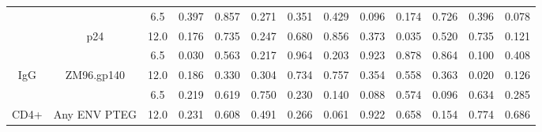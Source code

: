 \documentclass[12pt]{article} %
\begin{document}
\begin{tabular}{ccccccccccccc}
 &  & 6.5 & 0.397 & 0.857 & 0.271 & 0.351 & 0.429 & 0.096 & 0.174 & 0.726 & 0.396 & 0.078\\
\cmidrule{3-13}
 & \multirow{-3}{*}{\centering\arraybackslash p24} & 12.0 & 0.176 & 0.735 & 0.247 & 0.680 & 0.856 & 0.373 & 0.035 & 0.520 & 0.735 & 0.121\\
\cmidrule{2-13}
 &  & 6.5 & 0.030 & 0.563 & 0.217 & 0.964 & 0.203 & 0.923 & 0.878 & 0.864 & 0.100 & 0.408\\
\cmidrule{3-13}
\multirow{-12}{*}{\centering\arraybackslash IgG} & \multirow{-2}{*}{\centering\arraybackslash ZM96.gp140} & 12.0 & 0.186 & 0.330 & 0.304 & 0.734 & 0.757 & 0.354 & 0.558 & 0.363 & 0.020 & 0.126\\
\cmidrule{1-13}
 &  & 6.5 & 0.219 & 0.619 & 0.750 & 0.230 & 0.140 & 0.088 & 0.574 & 0.096 & 0.634 & 0.285\\
\cmidrule{3-13}
\multirow{-2}{*}{\centering\arraybackslash CD4+} & \multirow{-2}{*}{\centering\arraybackslash Any ENV PTEG} & 12.0 & 0.231 & 0.608 & 0.491 & 0.266 & 0.061 & 0.922 & 0.658 & 0.154 & 0.774 & 0.686\\
\bottomrule
\end{tabular} 
\end{document}
